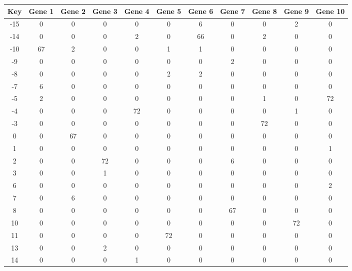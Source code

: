\begin{tabular}{|c|c|c|c|c|c|c|c|c|c|c|}
\hline
Key & Gene 1 & Gene 2 & Gene 3 & Gene 4 & Gene 5 & Gene 6 & Gene 7 & Gene 8 & Gene 9 & Gene 10 \\
\hline
-15 & 0 & 0 & 0 & 0 & 0 & 6 & 0 & 0 & 2 & 0 \\
-14 & 0 & 0 & 0 & 2 & 0 & 66 & 0 & 2 & 0 & 0 \\
-10 & 67 & 2 & 0 & 0 & 1 & 1 & 0 & 0 & 0 & 0 \\
-9 & 0 & 0 & 0 & 0 & 0 & 0 & 2 & 0 & 0 & 0 \\
-8 & 0 & 0 & 0 & 0 & 2 & 2 & 0 & 0 & 0 & 0 \\
-7 & 6 & 0 & 0 & 0 & 0 & 0 & 0 & 0 & 0 & 0 \\
-5 & 2 & 0 & 0 & 0 & 0 & 0 & 0 & 1 & 0 & 72 \\
-4 & 0 & 0 & 0 & 72 & 0 & 0 & 0 & 0 & 1 & 0 \\
-3 & 0 & 0 & 0 & 0 & 0 & 0 & 0 & 72 & 0 & 0 \\
0 & 0 & 67 & 0 & 0 & 0 & 0 & 0 & 0 & 0 & 0 \\
1 & 0 & 0 & 0 & 0 & 0 & 0 & 0 & 0 & 0 & 1 \\
2 & 0 & 0 & 72 & 0 & 0 & 0 & 6 & 0 & 0 & 0 \\
3 & 0 & 0 & 1 & 0 & 0 & 0 & 0 & 0 & 0 & 0 \\
6 & 0 & 0 & 0 & 0 & 0 & 0 & 0 & 0 & 0 & 2 \\
7 & 0 & 6 & 0 & 0 & 0 & 0 & 0 & 0 & 0 & 0 \\
8 & 0 & 0 & 0 & 0 & 0 & 0 & 67 & 0 & 0 & 0 \\
10 & 0 & 0 & 0 & 0 & 0 & 0 & 0 & 0 & 72 & 0 \\
11 & 0 & 0 & 0 & 0 & 72 & 0 & 0 & 0 & 0 & 0 \\
13 & 0 & 0 & 2 & 0 & 0 & 0 & 0 & 0 & 0 & 0 \\
14 & 0 & 0 & 0 & 1 & 0 & 0 & 0 & 0 & 0 & 0 \\
\hline
\end{tabular}